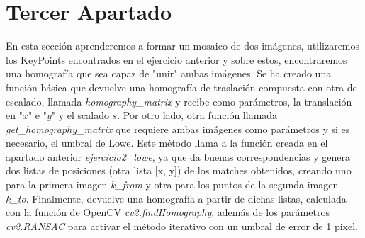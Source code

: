 \documentclass{article}
\begin{document}
\newpage

\section{Tercer Apartado}
En esta sección aprenderemos a formar un mosaico de dos imágenes, utilizaremos los KeyPoints encontrados  en el ejercicio anterior y sobre estos, encontraremos una homografía que sea capaz de "unir" ambas imágenes.
\newline\newline
Se ha creado una función básica que devuelve una homografía de traslación compuesta con otra de escalado, llamada \textit{homography\_matrix} y recibe como parámetros, la translación en "$x$" e "$y$" y el scalado $s$.
\newline\newline
Por otro lado, otra función llamada \textit{get\_homography\_matrix} que requiere ambas imágenes como parámetros y si es necesario, el umbral de Lowe. Este método llama a la función creada en el apartado anterior \textit{ejercicio2\_lowe}, ya que da buenas correspondencias y genera dos listas de posiciones (otra lista [x, y]) de los matches obtenidos, creando uno para la primera imagen \textit{k\_from} y otra para los puntos de la segunda imagen \textit{k\_to}. Finalmente, devuelve una homografía a partir de dichas listas, calculada con la función de OpenCV \textit{cv2.findHomography}, además de los parámetros \textit{cv2.RANSAC} para activar el método iterativo con un umbral de error de 1 pixel. 
\end{document}
